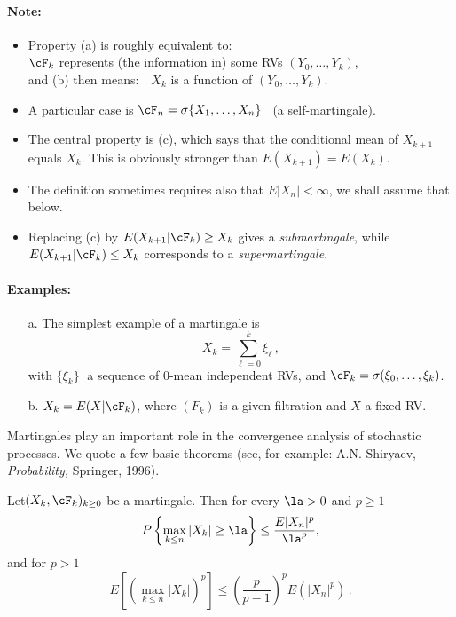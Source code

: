 \paragraph{Note:}
\begin{itemize}
\item
Property (a) is roughly equivalent to:\\
\hspace*{2cm}$\cF_k$ represents (the information in)
some RVs $(Y_0, \ldots, Y_k)$,
\\
and (b) then means:\ \
$X_k$  is a function of $(Y_0, \ldots, Y_k)$.
\item
A particular case is $\cF_n=\sigma\{X_1,\dots,X_n\}$
\ (a self-martingale).
\item
The central property is (c), which says that the conditional mean
of $X_{k+1}$ equals $X_k$. This is obviously
stronger than  $E(X_{k+1})=E(X_k)$.
\item
The definition sometimes requires also that $E|X_n|<\infty$,
we shall assume that below.
\item
Replacing (c) by $E(X_{k+1} | \cF_k) \geq X_k$ gives a {\em submartingale},
while $E(X_{k+1} | \cF_k) \leq X_k$ corresponds to a {\em supermartingale}.
\end{itemize}

\paragraph{Examples:}
\begin{itemize}
\item[a.]
The simplest {example} of a martingale is
$$
X_k = \sum_{\ell=0}^k \xi_\ell\,,
$$
with $\{\xi_k\}\;$ a sequence of 0-mean independent RVs, and
$\cF_k= \sigma (\xi_0, \ldots, \xi_k)$.
\item[b.]
$X_k=E(X|\cF_k)$, where $(F_k)$ is a given filtration and $X$ a fixed RV.
\end{itemize}

Martingales play an important role in the convergence analysis of
stochastic processes. We quote a few basic theorems
(see, for example: A.N. Shiryaev, {\it Probability,} Springer, 1996).

\begin{theorem}

Let$(X_k, \cF_k)_{k\ge 0}$ be a martingale. Then for every $\la>0$ and $p\ge 1$
$$
P\left\{ \max_{k\le n} |X_k| \ge \la \right\} \le \frac{E |X_n|^p}{\la^p},
$$
and for $p>1$
$$
E[(\max_{k\le n}|X_k|)^p ] \le \textstyle{(\frac{p}{p-1})^p} E(|X_n|^p) \,.
$$
\end{theorem}

